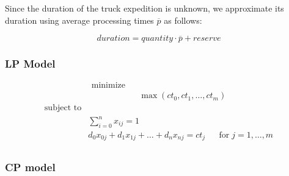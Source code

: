 \documentclass{ctuthesis}
\begin{document}
Since the duration of the truck expedition is unknown, we approximate its duration using average processing times $\overline{p}$ as follows:

\begin{equation}
     duration = quantity \cdot \overline{p} + reserve
\end{equation}
 
\subsubsection{LP Model}

\begin{equation}
\begin{aligned}
\text{minimize}\\
&&\max(ct_0, ct_1, \ldots, ct_m)
\end{aligned}
\end{equation}
\begin{equation}
\begin{aligned}
\text{subject to}\\
& \sum_{i=0}^{n} x_{ij} = 1 &&\\
& d_0x_{0j} + d_1x_{1j} + \ldots + d_nx_{nj} = ct_j && \text{for}\; j = 1, \ldots, m\\
\end{aligned}
\end{equation}

\subsubsection{CP model}
\end{document}
